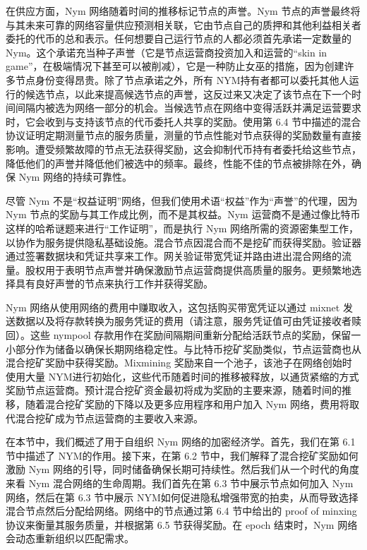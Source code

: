 \documentclass{article}
\begin{document}
	在供应方面，Nym 网络随着时间的推移标记节点的声誉。Nym 节点的声誉最终将与其未来可靠的网络容量供应预测相关联，它由节点自己的质押和其他利益相关者委托的代币的总和表示。任何想要自己运行节点的人都必须首先承诺一定数量的 Nym。这个承诺充当种子声誉（它是节点运营商投资加入和运营的“skin in game”，在极端情况下甚至可以被削减），它是一种防止女巫的措施，因为创建许多节点身份变得昂贵。除了节点承诺之外，所有 NYM持有者都可以委托其他人运行的候选节点，以此来提高候选节点的声誉，这反过来又决定了该节点在下一个时间间隔内被选为网络一部分的机会。当候选节点在网络中变得活跃并满足运营要求时，它会收到与支持该节点的代币委托人共享的奖励。使用第 6.4 节中描述的混合协议证明定期测量节点的服务质量，测量的节点性能对节点获得的奖励数量有直接影响。遭受频繁故障的节点无法获得奖励，这会抑制代币持有者委托给这些节点，降低他们的声誉并降低他们被选中的频率。最终，性能不佳的节点被排除在外，确保 Nym 网络的持续可靠性。\newline

	尽管 Nym 不是“权益证明”网络，但我们使用术语“权益”作为“声誉”的代理，因为 Nym 节点的奖励与其工作成比例，而不是其权益。Nym 运营商不是通过像比特币这样的哈希谜题来进行“工作证明”，而是执行 Nym 网络所需的资源密集型工作，以协作为服务提供隐私基础设施。混合节点因混合而不是挖矿而获得奖励。验证器通过签署数据块和凭证共享来工作。网关验证带宽凭证并路由进出混合网络的流量。股权用于表明节点声誉并确保激励节点运营商提供高质量的服务。更频繁地选择具有良好声誉的节点来执行工作并获得奖励。\newline

	Nym 网络从使用网络的费用中赚取收入，这包括购买带宽凭证以通过 mixnet 发送数据以及将存款转换为服务凭证的费用（请注意，服务凭证值可由凭证接收者赎回）。这些 nympool 存款用作在奖励间隔期间重新分配给活跃节点的奖励，保留一小部分作为储备以确保长期网络稳定性。与比特币挖矿奖励类似，节点运营商也从混合挖矿奖励中获得奖励。Mixmining 奖励来自一个池子，该池子在网络创始时使用大量 NYM进行初始化，这些代币随着时间的推移被释放，以通货紧缩的方式奖励节点运营商。预计混合挖矿资金最初将成为奖励的主要来源，随着时间的推移，随着混合挖矿奖励的下降以及更多应用程序和用户加入 Nym 网络，费用将取代混合挖矿成为节点运营商的主要收入来源。\newline

	在本节中，我们概述了用于自组织 Nym 网络的加密经济学。首先，我们在第 6.1 节中描述了 NYM的作用。接下来，在第 6.2 节中，我们解释了混合挖矿奖励如何激励 Nym 网络的引导，同时储备确保长期可持续性。然后我们从一个时代的角度来看 Nym 混合网络的生命周期。我们首先在第 6.3 节中展示节点如何加入 Nym 网络，然后在第 6.3 节中展示 NYM如何促进隐私增强带宽的拍卖，从而导致选择混合节点然后分配给网络。网络中的节点通过第 6.4 节中给出的 proof of minxing 协议来衡量其服务质量，并根据第 6.5 节获得奖励。在 epoch 结束时，Nym 网络会动态重新组织以匹配需求。\newline
	
\end{document}

